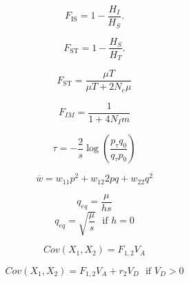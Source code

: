 \documentclass[12pt,twocolumn]{article}
\newcommand{\fis}{F_{\mathrm{IS}}}
\newcommand{\fst}{F_{\mathrm{ST}}}
\begin{document}
\begin{equation}
\fis =1-\frac{H_I}{H_S}.\nonumber
\end{equation}

\begin{equation}
\fst =1-\frac{H_S}{H_T}.\nonumber
\end{equation}

\begin{equation}
  \fst = \frac{\mu T}{\mu T + 2N_e \mu}
\end{equation}

\begin{equation}
  F_{IM} = \frac{1}{1 + 4N_I m}
\end{equation}


\begin{equation}
	\tau = -\frac{2}{s} \log \left(\frac{p_{\tau} q_0}{q_{\tau} p_0}\right)
\end{equation}

\begin{equation}
\overline{w} = w_{11}p^2+w_{12}2pq+w_{22}q^2
\end{equation}

\begin{equation}
q_{eq} = \frac{\mu}{hs}
\end{equation}
\begin{equation}
q_{eq} =\sqrt{\frac{\mu}{s}}~~~\textrm{if } h=0
\end{equation}

\begin{equation}
Cov(X_1,X_2)  = F_{1,2} V_A 
\end{equation}

\begin{equation}
Cov(X_1,X_2)  = F_{1,2} V_A + r_2 V_D~~~\textrm{if } V_D>0
\end{equation}
\end{document}
